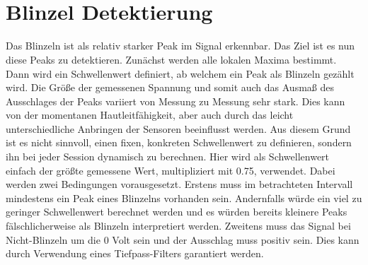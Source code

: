 \documentclass[11pt]{article}
\begin{document}
    \begin{center}
    \end{center}
    { \hspace*{\fill} \\}
    
    \begin{center}
    \end{center}
    { \hspace*{\fill} \\}
    
    \section{Blinzel Detektierung}\label{blinzel-detektierung}

Das Blinzeln ist als relativ starker Peak im Signal erkennbar. Das Ziel
ist es nun diese Peaks zu detektieren. Zunächst werden alle lokalen
Maxima bestimmt. Dann wird ein Schwellenwert definiert, ab welchem ein
Peak als Blinzeln gezählt wird. Die Größe der gemessenen Spannung und
somit auch das Ausmaß des Ausschlages der Peaks variiert von Messung zu
Messung sehr stark. Dies kann von der momentanen Hautleitfähigkeit, aber
auch durch das leicht unterschiedliche Anbringen der Sensoren
beeinflusst werden. Aus diesem Grund ist es nicht sinnvoll, einen fixen,
konkreten Schwellenwert zu definieren, sondern ihn bei jeder Session
dynamisch zu berechnen. Hier wird als Schwellenwert einfach der größte
gemessene Wert, multipliziert mit 0.75, verwendet. Dabei werden zwei
Bedingungen vorausgesetzt. Erstens muss im betrachteten Intervall
mindestens ein Peak eines Blinzelns vorhanden sein. Andernfalls würde
ein viel zu geringer Schwellenwert berechnet werden und es würden
bereits kleinere Peaks fälschlicherweise als Blinzeln interpretiert
werden. Zweitens muss das Signal bei Nicht-Blinzeln um die 0 Volt sein
und der Ausschlag muss positiv sein. Dies kann durch Verwendung eines
Tiefpass-Filters garantiert werden.
\end{document}
